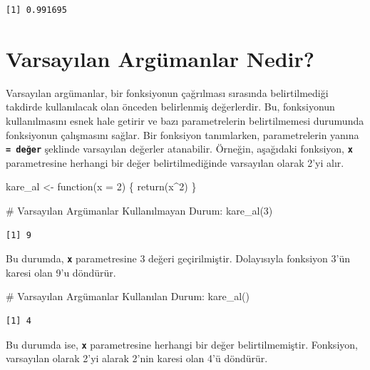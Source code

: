 \documentclass[
  letterpaper,
  DIV=11,
  numbers=noendperiod]{scrreprt}
\newenvironment{Shaded}{\begin{snugshade}}{\end{snugshade}}
\newcommand{\AttributeTok}[1]{\textcolor[rgb]{0.40,0.45,0.13}{#1}}
\newcommand{\CommentTok}[1]{\textcolor[rgb]{0.37,0.37,0.37}{#1}}
\newcommand{\ControlFlowTok}[1]{\textcolor[rgb]{0.00,0.23,0.31}{#1}}
\newcommand{\DecValTok}[1]{\textcolor[rgb]{0.68,0.00,0.00}{#1}}
\newcommand{\FunctionTok}[1]{\textcolor[rgb]{0.28,0.35,0.67}{#1}}
\newcommand{\NormalTok}[1]{\textcolor[rgb]{0.00,0.23,0.31}{#1}}
\newcommand{\OtherTok}[1]{\textcolor[rgb]{0.00,0.23,0.31}{#1}}
\newcommand{\SpecialCharTok}[1]{\textcolor[rgb]{0.37,0.37,0.37}{#1}}
\begin{document}
\begin{verbatim}
[1] 0.991695
\end{verbatim}

\section{\texorpdfstring{\textbf{Varsayılan Argümanlar
Nedir?}}{Varsayılan Argümanlar Nedir?}}\label{varsayux131lan-arguxfcmanlar-nedir}

Varsayılan argümanlar, bir fonksiyonun çağrılması sırasında
belirtilmediği takdirde kullanılacak olan önceden belirlenmiş
değerlerdir. Bu, fonksiyonun kullanılmasını esnek hale getirir ve bazı
parametrelerin belirtilmemesi durumunda fonksiyonun çalışmasını sağlar.
Bir fonksiyon tanımlarken, parametrelerin yanına
\textbf{\texttt{=\ değer}} şeklinde varsayılan değerler atanabilir.
Örneğin, aşağıdaki fonksiyon, \textbf{\texttt{x}} parametresine herhangi
bir değer belirtilmediğinde varsayılan olarak 2'yi alır.

\begin{Shaded}
\begin{Highlighting}[]
\NormalTok{kare\_al }\OtherTok{\textless{}{-}} \ControlFlowTok{function}\NormalTok{(}\AttributeTok{x =} \DecValTok{2}\NormalTok{) \{}
  \FunctionTok{return}\NormalTok{(x}\SpecialCharTok{\^{}}\DecValTok{2}\NormalTok{)}
\NormalTok{\}}

\CommentTok{\# Varsayılan Argümanlar Kullanılmayan Durum:}
\FunctionTok{kare\_al}\NormalTok{(}\DecValTok{3}\NormalTok{)}
\end{Highlighting}
\end{Shaded}

\begin{verbatim}
[1] 9
\end{verbatim}

Bu durumda, \textbf{\texttt{x}} parametresine 3 değeri geçirilmiştir.
Dolayısıyla fonksiyon 3'ün karesi olan 9'u döndürür.

\begin{Shaded}
\begin{Highlighting}[]
\CommentTok{\# Varsayılan Argümanlar Kullanılan Durum:}
\FunctionTok{kare\_al}\NormalTok{()}
\end{Highlighting}
\end{Shaded}

\begin{verbatim}
[1] 4
\end{verbatim}

Bu durumda ise, \textbf{\texttt{x}} parametresine herhangi bir değer
belirtilmemiştir. Fonksiyon, varsayılan olarak 2'yi alarak 2'nin karesi
olan 4'ü döndürür.
\end{document}
